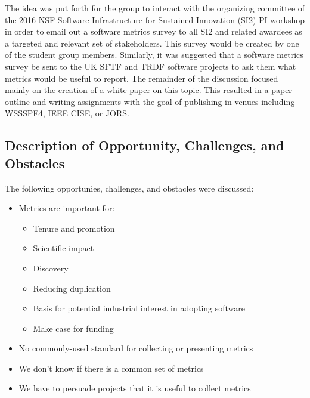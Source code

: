 \smallskip
\noindent
The idea was put forth for the group to interact with the organizing committee of the 2016 NSF Software Infrastructure for Sustained Innovation (SI2) PI workshop in order to email out a software metrics survey to all SI2 and related awardees as a targeted and relevant set of stakeholders.  This survey would be created by one of the student group members.  Similarly, it was suggested that a software metrics survey be sent to the UK SFTF and TRDF software projects to ask them what metrics would be useful to report.  The remainder of the discussion focused mainly on the creation of a white paper on this topic.  This resulted in a paper outline and writing assignments with the goal of publishing in venues including WSSSPE4, IEEE CISE, or JORS.



\subsection{Description of Opportunity, Challenges, and Obstacles}

The following opportunies, challenges, and obstacles were discussed:

\begin{itemize}
\item
Metrics are important for:

\begin{itemize}
\item
        Tenure and promotion

\item
        Scientific impact

\item
        Discovery

\item
        Reducing duplication

\item
        Basis for potential industrial interest in adopting software

\item
        Make case for funding
\end{itemize}

\item
No commonly-used standard for collecting or presenting metrics

\item
We don’t know if there is a common set of metrics

\item
We have to persuade projects that it is useful to collect metrics

\end{itemize}



